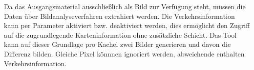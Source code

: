 Da das Ausgangsmaterial ausschließlich als Bild zur Verfügung steht, müssen die Daten über Bildanalyseverfahren extrahiert werden. Die Verkehrsinformation kann per Parameter aktiviert bzw. deaktiviert werden, dies ermöglicht den Zugriff auf die zugrundlegende Karteninformation ohne zusätzliche Schicht. Das Tool kann auf dieser Grundlage pro Kachel zwei Bilder generieren und davon die Differenz bilden. Gleiche Pixel könnnen ignoriert werden, abweichende enthalten Verkehrsinformation.

